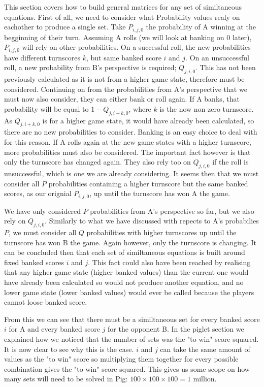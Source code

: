 \documentclass[a4paper,titlepage]{article}
\begin{document}
This section covers how to build general matrices for any set of similtaneous equations. First of all, we need to consider what Probability values realy on eachother to produce a single set. Take $P_{i,j,0}$ the probability of A winning at the begginning of their turn. Assuming A rolls (we will look at banking on 0 later), $P_{i,j,0}$ will rely on other probabilities. On a successful roll, the new probabilities have different turnscores $k$, but same banked score $i$ and $j$. On an unsuccessful roll, a new probability from B's perspective is required; $Q_{j,i,0}$. This has not been previously calculated as it is not from a higher game state, therefore must be considered. Continuing on from the probabilities from A's perspective that we must now also consider, they can either bank or roll again. If A banks, that probability will be equal to $1-Q_{j,i+k,0}$, where $k$ is the now non zero turnscore. As $Q_{j,i+k,0}$ is for a higher game state, it would have already been calculated, so there are no new probabilities to consider. Banking is an easy choice to deal with for this reason. If A rolls again at the new game states with a higher turnscore, more probabilities must also be considered. The important fact however is that only the turnscore has changed again. They also rely too on $Q_{j,i,0}$ if the roll is unsuccessful, which is one we are already considering. It seems then that we must consider all $P$ probabilities containing a higher turnscore but the same banked scores, as our orignial $P_{i,j,0}$, up until the turnscore has won A the game.

We have only considered $P$ probabilities from A's perspective so far, but we also rely on $Q_{j,i,0}$. Similarly to what we have discussed with repects to A's probabilies $P$, we must consider all $Q$ probabilities with higher turnscores up until the turnscore has won B the game. Again however, only the turnscore is changing. It can be concluded then that each set of similtaneous equations is built around fixed banked scores $i$ and $j$. This fact could also have been reached by realising that any higher game state (higher banked values) than the current one would have already been calculated so would not produce another equation, and no lower game state (lower banked values) would ever be called because the players cannot loose banked score.

From this we can see that there must be a similtaneous set for every banked score $i$ for A and every banked score $j$ for the opponent B. In the piglet section we explained how we noticed that the number of sets was the "to win" score squared. It is now clear to see why this is the case. $i$ and $j$ can take the same amount of values as the "to win" score so multiplying them together for every possible combination gives the "to win" score squared. This gives us some scope on how many sets will need to be solved in Pig: $100\times100\times100=1$ million.
\end{document}
